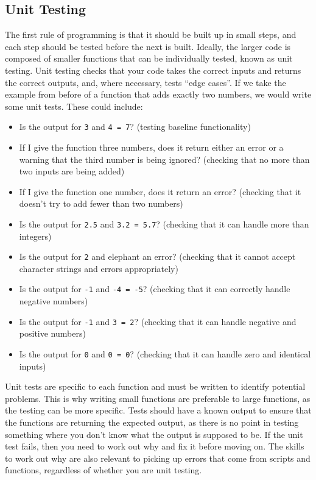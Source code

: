 \documentclass[
]{book}
\providecommand{\tightlist}{%
  \setlength{\itemsep}{0pt}\setlength{\parskip}{0pt}}
\begin{document}
\subsection{Unit Testing}\label{sec:UnitTesting}

The first rule of programming is that it should be built up in small steps, and each step should be tested before the next is built.
Ideally, the larger code is composed of smaller functions that can be individually tested, known as unit testing.
Unit testing checks that your code takes the correct inputs and returns the correct outputs, and, where necessary, tests ``edge cases''.
If we take the example from before of a function that adds exactly two numbers, we would write some unit tests.
These could include:

\begin{itemize}
\tightlist
\item
  Is the output for \texttt{3} and \texttt{4\ =\ 7}? (testing baseline functionality)
\item
  If I give the function three numbers, does it return either an error or a warning that the third number is being ignored? (checking that no more than two inputs are being added)
\item
  If I give the function one number, does it return an error? (checking that it doesn't try to add fewer than two numbers)
\item
  Is the output for \texttt{2.5} and \texttt{3.2\ =\ 5.7}? (checking that it can handle more than integers)
\item
  Is the output for \texttt{2} and elephant an error? (checking that it cannot accept character strings and errors appropriately)
\item
  Is the output for \texttt{-1} and \texttt{-4\ =\ -5}? (checking that it can correctly handle negative numbers)
\item
  Is the output for \texttt{-1} and \texttt{3\ =\ 2}? (checking that it can handle negative and positive numbers)
\item
  Is the output for \texttt{0} and \texttt{0\ =\ 0}? (checking that it can handle zero and identical inputs)
\end{itemize}

Unit tests are specific to each function and must be written to identify potential problems.
This is why writing small functions are preferable to large functions, as the testing can be more specific.
Tests should have a known output to ensure that the functions are returning the expected output, as there is no point in testing something where you don't know what the output is supposed to be.
If the unit test fails, then you need to work out why and fix it before moving on.
The skills to work out why are also relevant to picking up errors that come from scripts and functions, regardless of whether you are unit testing.
\end{document}
